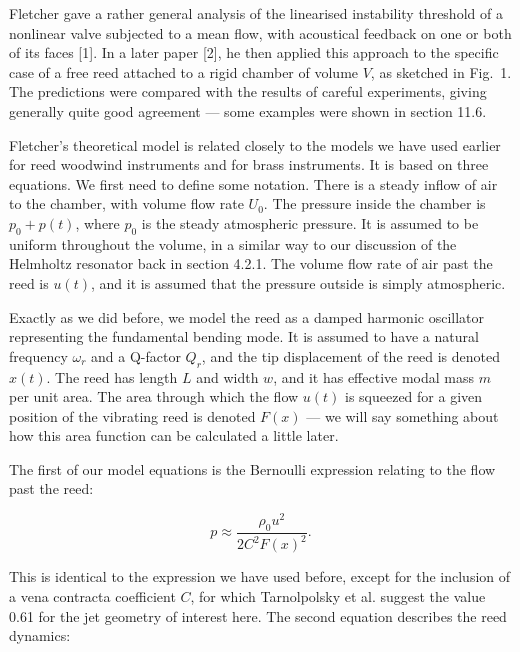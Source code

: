   Fletcher gave a rather general analysis of the linearised instability 
  threshold of a nonlinear valve subjected to a mean flow, with acoustical 
  feedback on one or both of its faces [1]. In a later paper [2], he then 
  applied this approach to the specific case of a free reed attached to a rigid 
  chamber of volume $V$, as sketched in Fig.\ 1. The predictions were compared 
  with the results of careful experiments, giving generally quite good 
  agreement --- some examples were shown in section 11.6. 


  Fletcher's theoretical model is related closely to the models we have used 
  earlier for reed woodwind instruments and for brass instruments. It is based 
  on three equations. We first need to define some notation. There is a steady 
  inflow of air to the chamber, with volume flow rate $U_0$. The pressure 
  inside the chamber is $p_0+p(t)$, where $p_0$ is the steady atmospheric 
  pressure. It is assumed to be uniform throughout the volume, in a similar way 
  to our discussion of the Helmholtz resonator back in section 4.2.1. The 
  volume flow rate of air past the reed is $u(t)$, and it is assumed that the 
  pressure outside is simply atmospheric. 

  Exactly as we did before, we model the reed as a damped harmonic oscillator 
  representing the fundamental bending mode. It is assumed to have a natural 
  frequency $\omega_r$ and a Q-factor $Q_r$, and the tip displacement of the 
  reed is denoted $x(t)$. The reed has length $L$ and width $w$, and it has 
  effective modal mass $m$ per unit area. The area through which the flow 
  $u(t)$ is squeezed for a given position of the vibrating reed is denoted 
  $F(x)$ --- we will say something about how this area function can be 
  calculated a little later. 

  The first of our model equations is the Bernoulli expression relating to the 
  flow past the reed: 

  \begin{equation*}p \approx \dfrac{\rho_0 u^2}{2 C^2 F(x)^2} . 
  \tag{1}\end{equation*} 

  This is identical to the expression we have used before, except for the 
  inclusion of a vena contracta coefficient $C$, for which Tarnolpolsky et al. 
  suggest the value 0.61 for the jet geometry of interest here. The second 
  equation describes the reed dynamics: 

